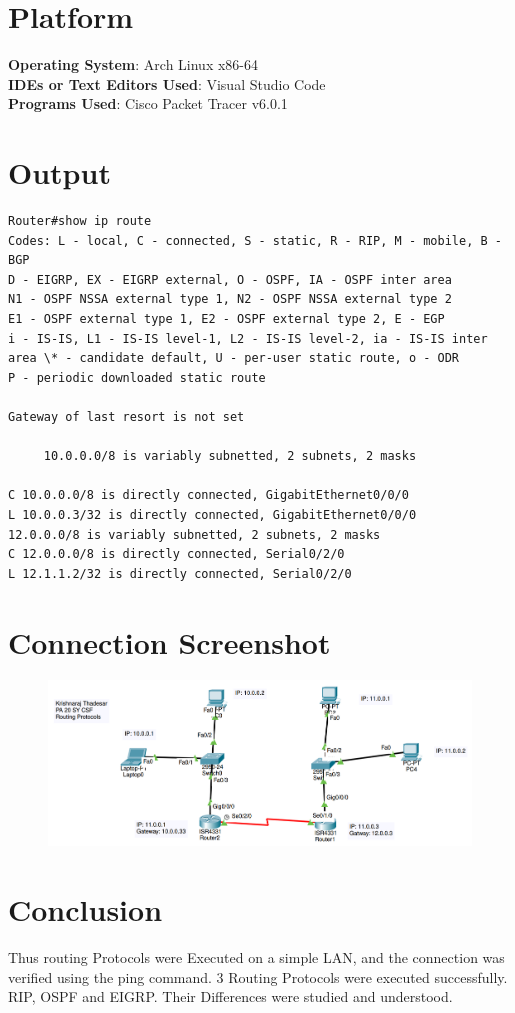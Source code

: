 \documentclass[11pt]{article}
\begin{document}
\section{Platform}
	\textbf{Operating System}: Arch Linux x86-64\\
	\textbf{IDEs or Text Editors Used}: Visual Studio Code\\
	\textbf{Programs Used}: Cisco Packet Tracer v6.0.1

\section{Output}
\begin{verbatim}
Router#show ip route
Codes: L - local, C - connected, S - static, R - RIP, M - mobile, B - BGP
D - EIGRP, EX - EIGRP external, O - OSPF, IA - OSPF inter area
N1 - OSPF NSSA external type 1, N2 - OSPF NSSA external type 2
E1 - OSPF external type 1, E2 - OSPF external type 2, E - EGP
i - IS-IS, L1 - IS-IS level-1, L2 - IS-IS level-2, ia - IS-IS inter area \* - candidate default, U - per-user static route, o - ODR
P - periodic downloaded static route

Gateway of last resort is not set

     10.0.0.0/8 is variably subnetted, 2 subnets, 2 masks

C 10.0.0.0/8 is directly connected, GigabitEthernet0/0/0
L 10.0.0.3/32 is directly connected, GigabitEthernet0/0/0
12.0.0.0/8 is variably subnetted, 2 subnets, 2 masks
C 12.0.0.0/8 is directly connected, Serial0/2/0
L 12.1.1.2/32 is directly connected, Serial0/2/0
\end{verbatim}
\section{Connection Screenshot}


\begin{figure}[H]
	\centering
	\includegraphics[scale=0.4]{../Screenshots/Assignment_7_screenshot.png}
\end{figure}


\section{Conclusion}
Thus routing Protocols were Executed on a simple LAN, and the connection was verified using the ping command. 3 Routing Protocols were executed successfully. RIP, OSPF and EIGRP. Their Differences were studied and understood. 
\end{document}
